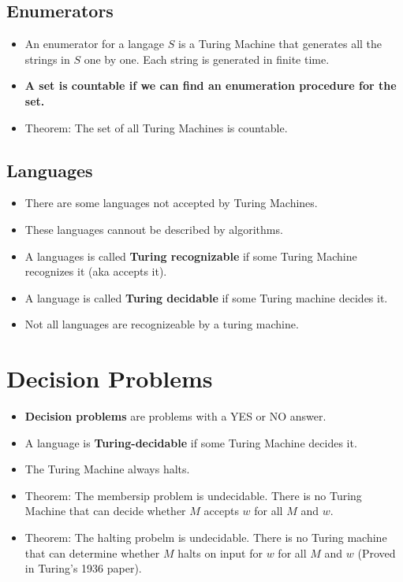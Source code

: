 \documentclass[letter]{article}
\begin{document}
\begin{multicols}{2}
	\subsection{Enumerators}
	\begin{itemize}
		\item An enumerator for a langage $S$ is a Turing Machine that generates
					all the strings in $S$ one by one. Each string is generated in finite
					time.
		\item \textbf{A set is countable if we can find an enumeration procedure for
					the set.}
		\item Theorem: The set of all Turing Machines is countable.
	\end{itemize}
	\subsection{Languages}
	\begin{itemize}
		\item There are some languages not accepted by Turing Machines.
		\item These languages cannout be described by algorithms.
		\item A languages is called \textbf{Turing recognizable} if some Turing
					Machine recognizes it (aka accepts it).
		\item A language is called \textbf{Turing decidable} if some Turing machine
					decides it.
		\item Not all languages are recognizeable by a turing machine.
	\end{itemize}

	\section{Decision Problems}
	\begin{itemize}
		\item \textbf{Decision problems} are problems with a YES or NO answer.
		\item A language is \textbf{Turing-decidable} if some Turing Machine decides
					it.
		\item The Turing Machine always halts.
		\item Theorem: The membersip problem is undecidable. There is no Turing
					Machine that can decide whether $M$ accepts $w$ for all $M$ and $w$.
		\item Theorem: The halting probelm is undecidable. There is no Turing
					machine that can determine whether $M$ halts on input for $w$ for all
					$M$ and $w$ (Proved in Turing's 1936 paper).
	\end{itemize}


\end{multicols}
\end{document}

